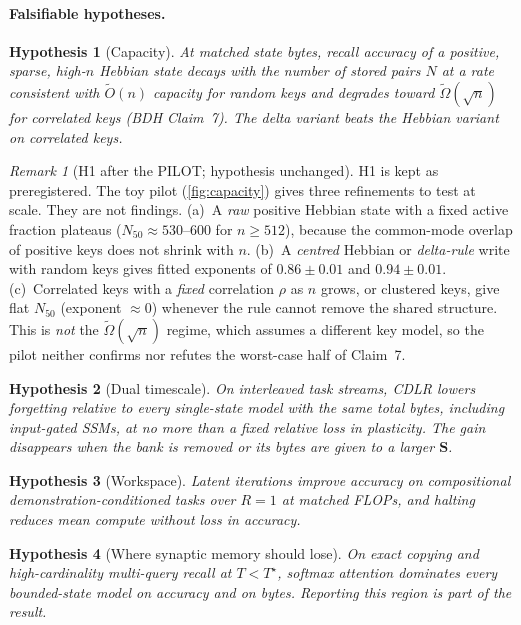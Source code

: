 \documentclass[10pt]{article}
\newtheorem{hypothesis}{Hypothesis}
\theoremstyle{remark}
\newtheorem{remark}{Remark}
\newcommand{\Sm}{\mathbf{S}}
\newcommand{\cdlr}{\textsc{CDLR}}
\begin{document}
\paragraph{Falsifiable hypotheses.}
\begin{hypothesis}[Capacity]\label{h:cap}
At matched state bytes, recall accuracy of a positive, sparse, high-$n$ Hebbian state decays with the number of
stored pairs $N$ at a rate consistent with $\tilde O(n)$ capacity for random keys and degrades toward
$\tilde\Omega(\sqrt n)$ for correlated keys (BDH Claim~7). The delta variant beats the Hebbian variant on correlated keys.
\end{hypothesis}
\begin{remark}[H1 after the PILOT; hypothesis unchanged]\label{rem:h1pilot}
H1 is kept as preregistered. The toy pilot (\cref{fig:capacity}) gives three refinements to test at scale. They are
not findings. (a)~A \emph{raw} positive Hebbian state with a fixed active fraction plateaus
($N_{50}\approx530$--$600$ for $n\ge512$), because the common-mode overlap of positive keys does not shrink with $n$.
(b)~A \emph{centred} Hebbian or \emph{delta-rule} write with random keys gives fitted exponents of $0.86\pm0.01$ and
$0.94\pm0.01$. (c)~Correlated keys with a \emph{fixed} correlation $\rho$ as $n$ grows, or clustered keys, give flat
$N_{50}$ (exponent $\approx0$) whenever the rule cannot remove the shared structure. This is \emph{not} the
$\tilde\Omega(\sqrt n)$ regime, which assumes a different key model, so the pilot neither confirms nor refutes the
worst-case half of Claim~7.
\end{remark}
\begin{hypothesis}[Dual timescale]\label{h:dual}
On interleaved task streams, \cdlr{} lowers forgetting relative to every single-state model with the same total
bytes, including input-gated SSMs, at no more than a fixed relative loss in plasticity. The gain disappears when the
bank is removed or its bytes are given to a larger $\Sm$.
\end{hypothesis}
\begin{hypothesis}[Workspace]\label{h:ws}
Latent iterations improve accuracy on compositional demonstration-conditioned tasks over $R=1$ at matched FLOPs, and
halting reduces mean compute without loss in accuracy.
\end{hypothesis}
\begin{hypothesis}[Where synaptic memory should lose]\label{h:lose}
On exact copying and high-cardinality multi-query recall at $T<T^\star$, softmax attention dominates every
bounded-state model on accuracy and on bytes. Reporting this region is part of the result.
\end{hypothesis}
\end{document}
